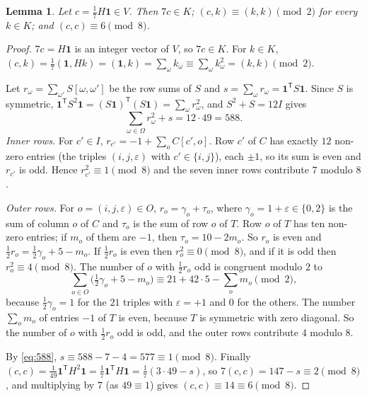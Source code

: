 \documentclass[11pt,a4paper]{article}
\newtheorem{lemma}[theorem]{Lemma}
\theoremstyle{definition}
\theoremstyle{remark}
\newcommand{\one}{\mathbf{1}}
\newcommand{\tp}{\mathsf{T}}
\newcommand{\Om}{\Omega}
\begin{document}
\begin{lemma}\label{lem:char}
Let $c=\frac17H\one\in V$. Then $7c\in K$; $(c,k)\equiv(k,k)\pmod2$ for every $k\in K$; and $(c,c)\equiv6\pmod8$.
\end{lemma}
\begin{proof}
$7c=H\one$ is an integer vector of $V$, so $7c\in K$. For $k\in K$, $(c,k)=\frac17(\one,Hk)=(\one,k)=\sum_\omega
k_\omega\equiv\sum_\omega k_\omega^2=(k,k)\pmod2$.

Let $r_\omega=\sum_{\omega'}S[\omega,\omega']$ be the row sums of $S$ and $s=\sum_\omega r_\omega=\one^{\tp}S\one$.
Since $S$ is symmetric, $\one^{\tp}S^2\one=(S\one)^{\tp}(S\one)=\sum_\omega r_\omega^2$, and $S^2+S=12I$ gives
\begin{equation}\label{eq:588}
\sum_{\omega\in\Om}r_\omega^2+s=12\cdot49=588 .
\end{equation}
\emph{Inner rows.} For $c'\in I$, $r_{c'}=-1+\sum_oC[c',o]$. Row $c'$ of $C$ has exactly $12$ non-zero entries (the
triples $(i,j,\varepsilon)$ with $c'\in\{i,j\}$), each $\pm1$, so its sum is even and $r_{c'}$ is odd. Hence
$r_{c'}^2\equiv1\pmod8$ and the seven inner rows contribute $7$ modulo $8$.

\emph{Outer rows.} For $o=(i,j,\varepsilon)\in O$, $r_o=\gamma_o+\tau_o$, where $\gamma_o=1+\varepsilon\in\{0,2\}$ is
the sum of column $o$ of $C$ and $\tau_o$ is the sum of row $o$ of $T$. Row $o$ of $T$ has ten non-zero entries; if
$m_o$ of them are $-1$, then $\tau_o=10-2m_o$. So $r_o$ is even and $\frac12r_o=\frac12\gamma_o+5-m_o$. If
$\frac12r_o$ is even then $r_o^2\equiv0\pmod8$, and if it is odd then $r_o^2\equiv4\pmod8$. The number of $o$ with
$\frac12r_o$ odd is congruent modulo $2$ to
\[
\sum_{o\in O}\bigl(\tfrac12\gamma_o+5-m_o\bigr)\equiv21+42\cdot5-\sum_om_o\pmod2 ,
\]
because $\frac12\gamma_o=1$ for the $21$ triples with $\varepsilon=+1$ and $0$ for the others. The number
$\sum_om_o$ of entries $-1$ of $T$ is even, because $T$ is symmetric with zero diagonal. So the number of $o$ with
$\frac12r_o$ odd is odd, and the outer rows contribute $4$ modulo $8$.

By \eqref{eq:588}, $s\equiv588-7-4=577\equiv1\pmod8$. Finally
$(c,c)=\frac1{49}\one^{\tp}H^2\one=\frac17\one^{\tp}H\one=\frac17(3\cdot49-s)$, so $7(c,c)=147-s\equiv2\pmod8$, and
multiplying by $7$ (as $49\equiv1$) gives $(c,c)\equiv14\equiv6\pmod8$.
\end{proof}
\end{document}
